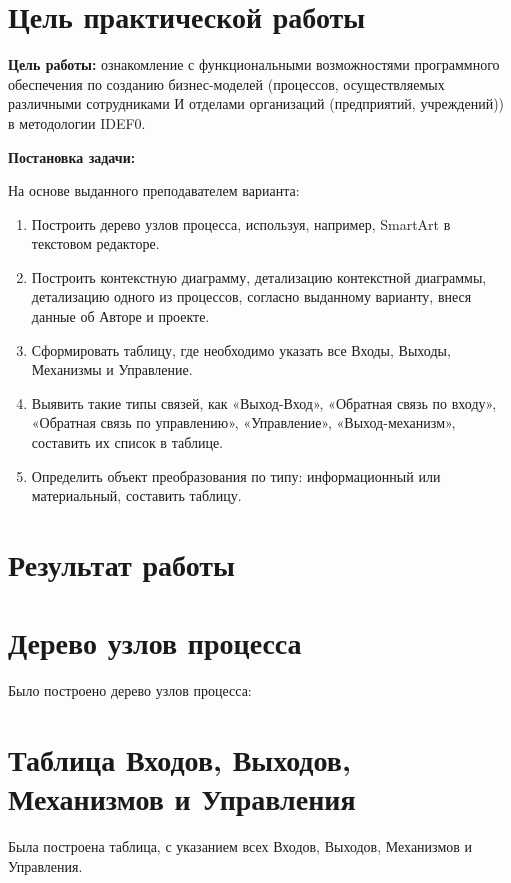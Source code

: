 
\section*{\LARGE Цель практической работы}

\textbf{Цель работы:} ознакомление с функциональными возможностями программного обеспечения по созданию бизнес-моделей
(процессов, осуществляемых различными сотрудниками И отделами организаций (предприятий, учреждений))
в методологии IDEF0.



\textbf{Постановка задачи:}\par
На основе выданного преподавателем варианта:

\begin{enumerate}
	\item Построить дерево узлов процесса, используя, например, SmartArt в текстовом редакторе.
	\item Построить контекстную диаграмму, детализацию контекстной диаграммы, детализацию одного из процессов, согласно выданному варианту, внеся данные об Авторе и проекте.
	\item Сформировать таблицу, где необходимо указать все Входы, Выходы, Механизмы и Управление.
	\item Выявить такие типы связей, как «Выход-Вход», «Обратная связь по входу», «Обратная связь по управлению», «Управление», «Выход-механизм», составить их список в таблице.
	\item Определить объект преобразования по типу: информационный или материальный, составить таблицу.
\end{enumerate}


\newpage

\section*{\LARGE Результат работы}

\section{Дерево узлов процесса}

Было построено дерево узлов процесса:


\newpage

\section{Таблица Входов, Выходов, Механизмов и Управления}
Была построена таблица, с указанием всех Входов, Выходов, Механизмов и Управления.

